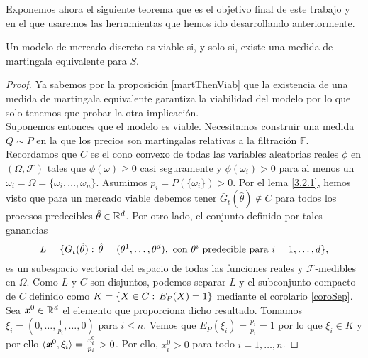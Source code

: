 Exponemos ahora el siguiente teorema que es el objetivo final de este trabajo y en el que usaremos las herramientas que hemos ido desarrollando anteriormente.
\begin{teoremaBox}\label{VIABLEiofEMM}
	Un modelo de mercado discreto es viable si, y solo si, existe una medida de martingala equivalente para $ S $.
\end{teoremaBox}
\begin{proof}
	Ya sabemos por la proposición \ref{martThenViab} que la existencia de una medida de martingala equivalente garantiza la viabilidad del modelo por lo que solo tenemos que probar la otra implicación. \\
	
	Suponemos entonces que el modelo es viable. Necesitamos construir una medida $ Q \sim P $ en la que los precios son martingalas relativas a la filtración $ \mathbb{F} $. Recordamos que $ C $ es el cono convexo de todas las variables aleatorias reales $ \phi $ en $ (\Omega, \mathcal{F}) $ tales que $ \phi(\omega) \geq 0 $ casi seguramente y $ \phi(\omega_i) > 0 $ para al menos un $ \omega_i = \Omega = \{\omega_i,\dots, \omega_n \} $. Asumimos $ p_i = P(\{\omega_i\}) > 0 $. Por el lema \ref{3.2.1}, hemos visto que para un mercado viable debemos tener $ \bar{G}_t(\hat{\theta}) \notin C$ para todos los procesos predecibles $ \hat{\theta} \in  \mathbb{R}^d $. Por otro lado, el conjunto definido por tales ganancias 
	\[
	L = \{\bar{G}_t(\hat{\theta}):\hspace{0.5mm} \hat{\theta}=(\theta^1,\dots,\theta^d),\text{ con } \theta^i \text{ predecible para } i=1,\dots,d \},
	\]
	es un subespacio vectorial del espacio de todas las funciones reales y  $ \mathcal{F} $-medibles en $ \Omega $. Como $ L $ y $ C $ son disjuntos, podemos separar $ L $ y el subconjunto compacto de $ C $ definido como $ K =\{X\in C: \hspace{0.5mm} E_P(X) = 1\} $ mediante el corolario \ref{coroSep}. Sea $ \textbf{\emph{x}}^0 \in \mathbb{R}^d $ el elemento que proporciona dicho resultado. Tomamos $ \xi_i = (0,\dots,\frac{1}{p_i},\dots,0) $ para $ i \leq n $. Vemos que $ E_P(\xi_i) = \frac{p_i}{p_i} = 1$ por lo que $ \xi_i \in K $ y por ello $ \langle \textbf{\emph{x}}^0, \xi_i \rangle = \frac{x^0_i}{p_i} > 0$. Por ello, $ x^0_i > 0$ para todo $ i=1,\dots,n $.
	

\end{proof}
